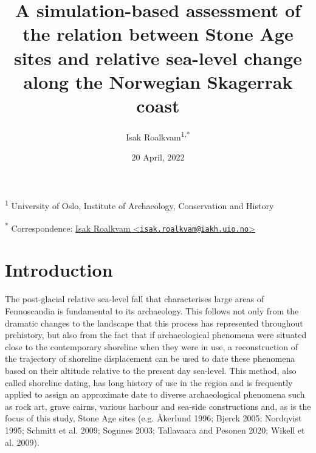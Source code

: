 \documentclass[
]{article}
\title{A simulation-based assessment of the relation between Stone Age sites and relative sea-level change along the Norwegian Skagerrak coast}
\author{Isak Roalkvam\textsuperscript{1,*}}
\date{20 April, 2022}
\begin{document}
\maketitle

\textsuperscript{1} University of Oslo, Institute of Archaeology, Conservation and History

\textsuperscript{*} Correspondence: \href{mailto:isak.roalkvam@iakh.uio.no}{Isak Roalkvam \textless{}\href{mailto:isak.roalkvam@iakh.uio.no}{\nolinkurl{isak.roalkvam@iakh.uio.no}}\textgreater{}}

\pagestyle{plain}

\hypertarget{introduction}{%
\section{Introduction}\label{introduction}}

The post-glacial relative sea-level fall that characterises large areas of Fennoscandia is fundamental to its archaeology. This follows not only from the dramatic changes to the landscape that this process has represented throughout prehistory, but also from the fact that if archaeological phenomena were situated close to the contemporary shoreline when they were in use, a reconstruction of the trajectory of shoreline displacement can be used to date these phenomena based on their altitude relative to the present day sea-level. This method, also called shoreline dating, has long history of use in the region and is frequently applied to assign an approximate date to diverse archaeological phenomena such as rock art, grave cairns, various harbour and sea-side constructions and, as is the focus of this study, Stone Age sites (e.g. Åkerlund 1996; Bjerck 2005; Nordqvist 1995; Schmitt et al. 2009; Sognnes 2003; Tallavaara and Pesonen 2020; Wikell et al. 2009).
\end{document}
